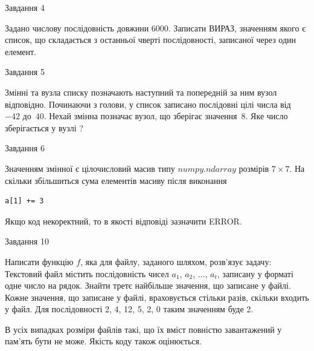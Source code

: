 \documentclass[12pt, ukrainian]{article}
\begin{document}
{               
{\begin{center}Завдання {4}\end{center}}
\vspace{-6mm}

 Задано числову послідовність  довжини 6000. Записати ВИРАЗ, значенням якого є список, що складається з останньої чверті послідовності, записаної через один елемент.\par

\vspace{10mm}
               
{\begin{center}Завдання {5}\end{center}}
\vspace{-6mm}
Змінні  та  вузла списку позначають наступний та попередній за ним вузол відповідно. Починаючи з голови, у список записано послідовні цілі числа від~$-42$ до~$40$. Нехай змінна  позначає вузол, що зберігає значення~$8$.
Яке число зберігається у вузлі  ?\par

               
{\begin{center}Завдання {6}\end{center}}
\vspace{-6mm}
Значенням змінної  є цілочисловий масив типу $numpy.ndarray$ розмірів $7{\times}7$. На скільки збільшиться сума елементів масиву  після виконання
\begin{verbatim}
a[1] += 3
\end{verbatim}


Якщо код некоректний, то в якості відповіді зазначити ERROR.\par

               
{\begin{center}Завдання {10}\end{center}}
\vspace{-6mm}

Написати функцію $f$, яка для файлу, заданого шляхом, розв’язує задачу:\\ Текстовий файл містить послідовність чисел $a_1$, $a_2$, $\ldots$, $a_t$, записану у форматі одне число на рядок. Знайти третє найбільше значення, що записане у файлі. Кожне значення, що записане у файлі, враховується стільки разів, скільки входить у файл. Для послідовності 2, 4, 12, 5, 2, 0 таким значенням буде 2.

В усіх випадках розміри файлів такі, що їх вміст повністю завантажений у пам'ять бути не може. Якість коду також оцінюється.



}
\end{document}
